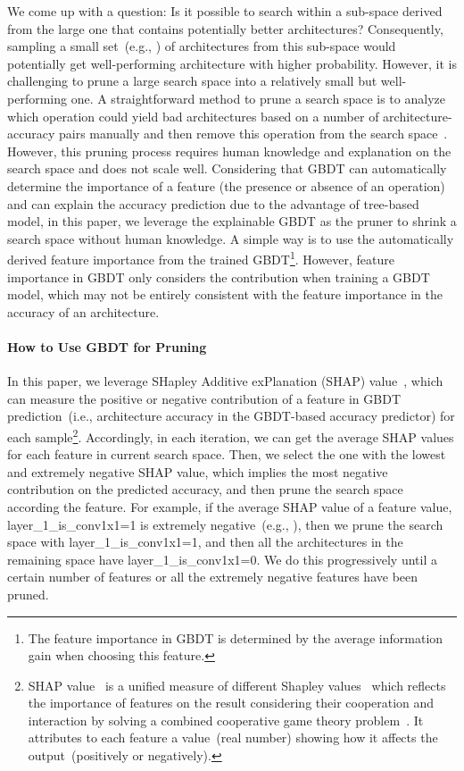 \documentclass{article}
\begin{document}
We come up with a question: Is it possible to search within a sub-space derived from the large one that contains potentially better architectures? Consequently, sampling a small set~(e.g., ) of architectures from this sub-space would potentially get well-performing architecture with higher probability. However, it is challenging to prune a large search space into a relatively small but well-performing one. A straightforward method to prune a search space is to analyze which operation could yield bad architectures based on a number of architecture-accuracy pairs manually and then remove this operation from the search space~\cite{designspace}. However, this pruning process requires human knowledge and explanation on the search space and does not scale well. Considering that GBDT can automatically determine the importance of a feature (the presence or absence of an operation) and can explain the accuracy prediction due to the advantage of tree-based model, in this paper, we leverage the explainable GBDT as the pruner to shrink a search space without human knowledge. A simple way is to use the automatically derived feature importance from the trained GBDT\footnote{The feature importance in GBDT is determined by the average information gain when choosing this feature.}. However, feature importance in GBDT only considers the contribution when training a GBDT model, which may not be entirely consistent with the feature importance in the accuracy of an architecture.




\paragraph{How to Use GBDT for Pruning} In this paper, we leverage SHapley Additive exPlanation (SHAP) value~\cite{unifiedshap}, which can measure the positive or negative contribution of a feature in GBDT prediction~(i.e., architecture accuracy in the GBDT-based accuracy predictor) for each sample\footnote{SHAP value~\cite{unifiedshap} is a unified measure of different Shapley values~\cite{shapleyregression,shapleysampling,quantinputinfluence} which reflects the importance of features on the result considering their cooperation and interaction by solving a combined cooperative game theory problem~\cite{shapleyvalue}. It attributes to each feature a value~(real number) showing how it affects the output~(positively or negatively).}. Accordingly, in each iteration, we can get the average SHAP values for each feature in current search space. Then, we select the one with the lowest and extremely negative SHAP value, which implies the most negative contribution on the predicted accuracy, and then prune the search space according the feature. For example, if the average SHAP value of a feature value, layer\_1\_is\_conv1x1=1 is extremely negative~(e.g., ), then we prune the search space with layer\_1\_is\_conv1x1=1, and then all the architectures in the remaining space have layer\_1\_is\_conv1x1=0. We do this progressively until a certain number of features or all the extremely negative features have been pruned.
\end{document}
